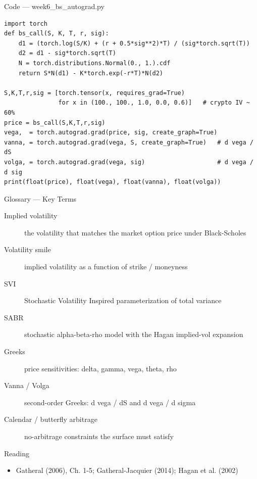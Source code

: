 \documentclass[aspectratio=169,10pt]{beamer}
\begin{document}
\begin{frame}[fragile]{Code --- week6\_bs\_autograd.py}
\begin{lstlisting}
import torch
def bs_call(S, K, T, r, sig):
    d1 = (torch.log(S/K) + (r + 0.5*sig**2)*T) / (sig*torch.sqrt(T))
    d2 = d1 - sig*torch.sqrt(T)
    N = torch.distributions.Normal(0., 1.).cdf
    return S*N(d1) - K*torch.exp(-r*T)*N(d2)

S,K,T,r,sig = [torch.tensor(x, requires_grad=True)
               for x in (100., 100., 1.0, 0.0, 0.6)]   # crypto IV ~ 60%
price = bs_call(S,K,T,r,sig)
vega,  = torch.autograd.grad(price, sig, create_graph=True)
vanna, = torch.autograd.grad(vega, S, create_graph=True)   # d vega / dS
volga, = torch.autograd.grad(vega, sig)                    # d vega / d sig
print(float(price), float(vega), float(vanna), float(volga))
\end{lstlisting}
\end{frame}
\begin{frame}{Glossary --- Key Terms}
\footnotesize\begin{description}
\item[\color{ncsured}Implied volatility] the volatility that matches the market option price under Black-Scholes
\item[\color{ncsured}Volatility smile] implied volatility as a function of strike / moneyness
\item[\color{ncsured}SVI] Stochastic Volatility Inspired parameterization of total variance
\item[\color{ncsured}SABR] stochastic alpha-beta-rho model with the Hagan implied-vol expansion
\item[\color{ncsured}Greeks] price sensitivities: delta, gamma, vega, theta, rho
\item[\color{ncsured}Vanna / Volga] second-order Greeks: d vega / dS and d vega / d sigma
\item[\color{ncsured}Calendar / butterfly arbitrage] no-arbitrage constraints the surface must satisfy
\end{description}
\end{frame}

\begin{frame}{Reading}
\begin{itemize}
  \item Gatheral (2006), Ch. 1-5; Gatheral-Jacquier (2014); Hagan et al. (2002)
\end{itemize}
\end{frame}
\end{document}
